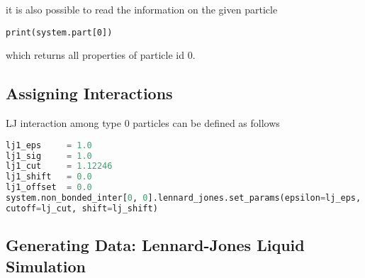 \documentclass[
paper=a4,                       %
fontsize=11pt,                  %
twoside,                        %
footsepline,                    %
headsepline,                    %
headinclude=false,              %
footinclude=false,              %
pagesize,                       %
]{scrartcl}
\begin{document}
\noindent it is also possible to read the information on the given particle

{\small\vspace{0,2cm}
\begin{lstlisting}[numbers=none]
print(system.part[0])
\end{lstlisting}\vspace{0,2cm}
} 

\noindent which returns all properties of particle id 0.

\subsection{Assigning Interactions}  
LJ interaction among type 0 particles can be defined as follows

{\small\vspace{0,2cm}
\begin{lstlisting}[language=Python, numbers=none]
lj1_eps     = 1.0
lj1_sig     = 1.0
lj1_cut     = 1.12246
lj1_shift   = 0.0
lj1_offset  = 0.0
system.non_bonded_inter[0, 0].lennard_jones.set_params(epsilon=lj_eps, sigma=lj_sig,
cutoff=lj_cut, shift=lj_shift)
\end{lstlisting}
}\vspace{0,2cm}



\subsection{Generating Data: Lennard-Jones Liquid Simulation }

   
\end{document}
